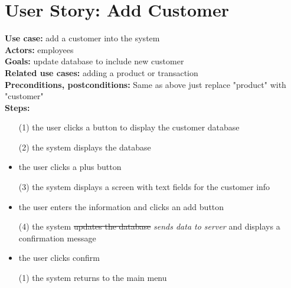 \documentclass[notitlepage,11pt]{article}
\begin{document}
\section{User Story: Add Customer}
	\textbf{Use case:} add a customer into the system\\
	\textbf{Actors:} employees\\
	\textbf{Goals:} update database to include new customer\\
	\textbf{Related use cases:} adding a product or transaction\\
	\textbf{Preconditions, postconditions:} Same as above just replace "product" with "customer"\\
		\textbf{Steps:}
		\begin{itemize}
		\item[(1)] the user clicks a button to display the customer database
		\item[(2)] the system displays the database
		\item the user clicks a plus button 
		\item[(3)] the system displays a screen with text fields for the customer info
		\item the user enters the information and clicks an add button
		\item[(4)] the system \sout{updates the database} \emph{sends data to server} and displays a confirmation message
		\item the user clicks confirm 
		\item[(1)] the system returns to the main menu
		\end{itemize}
\end{document}
